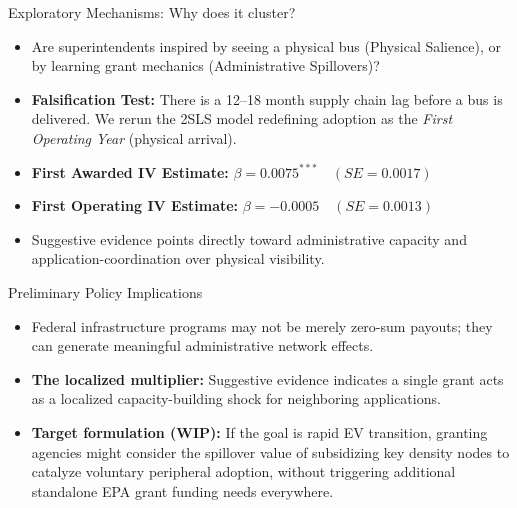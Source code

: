 \documentclass[aspectratio=169]{beamer}
\begin{document}
\begin{frame}{Exploratory Mechanisms: Why does it cluster?}
    \begin{itemize}
        \item Are superintendents inspired by seeing a physical bus (Physical Salience), or by learning grant mechanics (Administrative Spillovers)?
        \item \textbf{Falsification Test:} There is a 12--18 month supply chain lag before a bus is delivered. We rerun the 2SLS model redefining adoption as the \textit{First Operating Year} (physical arrival).
        \vspace{0.3cm}
        \item \textbf{First Awarded IV Estimate:} $\beta = 0.0075^{***} \quad (SE = 0.0017)$
        \item \textbf{First Operating IV Estimate:} $\beta = -0.0005 \quad (SE = 0.0013)$
        \vspace{0.3cm}
        \item Suggestive evidence points directly toward administrative capacity and application-coordination over physical visibility.
    \end{itemize}
\end{frame}

\begin{frame}{Preliminary Policy Implications}
    \begin{itemize}
        \item Federal infrastructure programs may not be merely zero-sum payouts; they can generate meaningful administrative network effects.
        \item \textbf{The localized multiplier:} Suggestive evidence indicates a single grant acts as a localized capacity-building shock for neighboring applications.
        \item \textbf{Target formulation (WIP):} If the goal is rapid EV transition, granting agencies might consider the spillover value of subsidizing key density nodes to catalyze voluntary peripheral adoption, without triggering additional standalone EPA grant funding needs everywhere.
    \end{itemize}
\end{frame}

\end{document}
